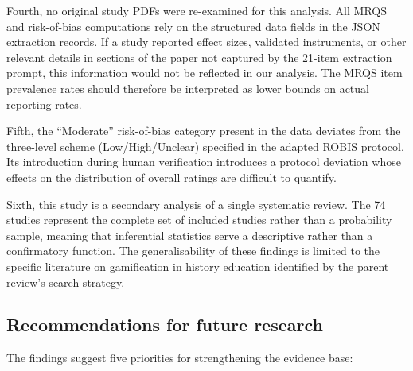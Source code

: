 \documentclass[etq]{acnsart}
\begin{document}
	Fourth, no original study PDFs were re-examined for this analysis. All MRQS and risk-of-bias computations rely on the structured data fields in the JSON extraction records. If a study reported effect sizes, validated instruments, or other relevant details in sections of the paper not captured by the 21-item extraction prompt, this information would not be reflected in our analysis. The MRQS item prevalence rates should therefore be interpreted as lower bounds on actual reporting rates.
	
	Fifth, the ``Moderate'' risk-of-bias category present in the data deviates from the three-level scheme (Low/High/Unclear) specified in the adapted ROBIS protocol. Its introduction during human verification introduces a protocol deviation whose effects on the distribution of overall ratings are difficult to quantify.
	
	Sixth, this study is a secondary analysis of a single systematic review. The 74 studies represent the complete set of included studies rather than a probability sample, meaning that inferential statistics serve a descriptive rather than a confirmatory function. The generalisability of these findings is limited to the specific literature on gamification in history education identified by the parent review's search strategy.
	
	\subsection{Recommendations for future research}
	\label{sec:discussion_recommendations}
	
	The findings suggest five priorities for strengthening the evidence base:
	
\end{document}
